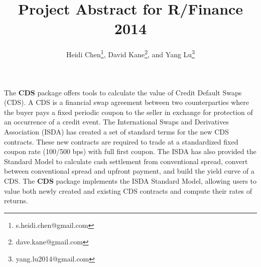\documentclass[12pt]{article}
\title{Project Abstract for R/Finance 2014}
\author{Heidi Chen\thanks{s.heidi.chen@gmail.com}, David Kane\thanks{dave.kane@gmail.com}, and Yang Lu\thanks{yang.lu2014@gmail.com}}
\theoremstyle{plain}
\begin{document}
\vspace*{-3cm}
 {\let\newpage\relax\maketitle}


The \textbf{CDS} package offers tools to calculate the value of Credit
Default Swaps (CDS). A CDS is a financial swap agreement between two
counterparties where the buyer pays a fixed periodic coupon to the
seller in exchange for protection of an occurrence of a credit
event. The International Swaps and Derivatives Association (ISDA) has
created a set of standard terms for the new CDS contracts. These new
contracts are required to trade at a standardized fixed coupon rate
(100/500 bps) with full first coupon. The ISDA has also provided the
Standard Model to calculate cash settlement from conventional spread,
convert between conventional spread and upfront payment, and build the
yield curve of a CDS. The \textbf{CDS} package implements the ISDA
Standard Model, allowing users to value both newly created and
existing CDS contracts and compute their rates of returns.
\end{document}
